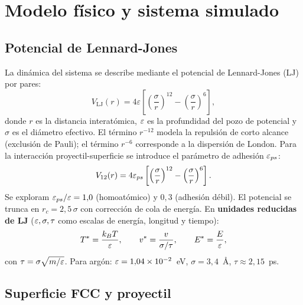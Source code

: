 \section{Modelo físico y sistema simulado}
\label{sec:modelo}

\subsection{Potencial de Lennard-Jones}

La dinámica del sistema se describe mediante el potencial de Lennard-Jones (LJ)
por pares:
%
\begin{equation}
    V_{\mathrm{LJ}}(r) = 4\varepsilon
    \left[
        \left(\frac{\sigma}{r}\right)^{12}
        -
        \left(\frac{\sigma}{r}\right)^{6}
    \right],
    \label{eq:lj}
\end{equation}
%
donde $r$ es la distancia interatómica, $\varepsilon$ es la profundidad del pozo de
potencial y $\sigma$ es el diámetro efectivo. El término $r^{-12}$ modela la
repulsión de corto alcance (exclusión de Pauli); el término $r^{-6}$ corresponde
a la dispersión de London. Para la interacción proyectil-superficie se introduce
el parámetro de adhesión $\varepsilon_{ps}$:
%
\begin{equation}
    V_{12}(r) = 4\varepsilon_{ps}
    \left[
        \left(\frac{\sigma}{r}\right)^{12}
        -
        \left(\frac{\sigma}{r}\right)^{6}
    \right].
    \label{eq:lj_ps}
\end{equation}
%
Se exploram $\varepsilon_{ps}/\varepsilon = 1{,}0$ (homoatómico) y $0{,}3$ (adhesión débil).
El potencial se trunca en $r_c = 2{,}5\,\sigma$ con corrección de cola de
energía. En \textbf{unidades reducidas de LJ} ($\varepsilon, \sigma, \tau$ como
escalas de energía, longitud y tiempo):
%
\begin{equation}
    T^* = \frac{k_B T}{\varepsilon},
    \qquad
    v^* = \frac{v}{\sigma/\tau},
    \qquad
    E^* = \frac{E}{\varepsilon},
    \label{eq:unidades}
\end{equation}
%
con $\tau = \sigma\sqrt{m/\varepsilon}$. Para argón: $\varepsilon = 1{,}04\times10^{-2}$~eV,
$\sigma = 3{,}4$~\AA{}, $\tau \approx 2{,}15$~ps.

\subsection{Superficie FCC y proyectil}

